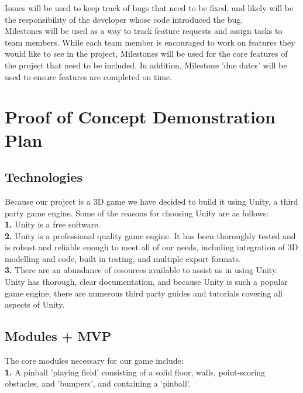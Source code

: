 \documentclass{article}
\begin{document}
Issues will be used to keep track of bugs that need to be fixed, and likely will be the responsibility of the developer whose code introduced the bug. \\

Milestones will be used as a way to track feature requests and assign tasks to team members. While each team member is encouraged to work on features they would like to see in the project, Milestones will be used for the core features of the project that need to be included. In addition, Milestone 'due dates' will be used to ensure features are completed on time.\\


\section{Proof of Concept Demonstration Plan}


\subsection{Technologies}

Because our project is a 3D game we have decided to build it using Unity, a third party game engine. Some of the reasons for choosing Unity are as follows:\\

\textbf{1.} Unity is a free software.\\

\textbf{2.} Unity is a professional quality game engine. It has been thoroughly tested and is robust and reliable enough to meet all of our needs, including integration of 3D modelling and code, built in testing, and multiple export formats.\\

\textbf{3.} There are an abundance of resources available to assist us in using Unity. Unity has thorough, clear documentation, and because Unity is such a popular game engine, there are numerous third party guides and tutorials covering all aspects of Unity. 

\subsection{Modules + MVP}

The core modules necessary for our game include: \\

\textbf{1.} A pinball 'playing field' consisting of a solid floor, walls, point-scoring obstacles, and 'bumpers', and containing a 'pinball'. \\
\end{document}
